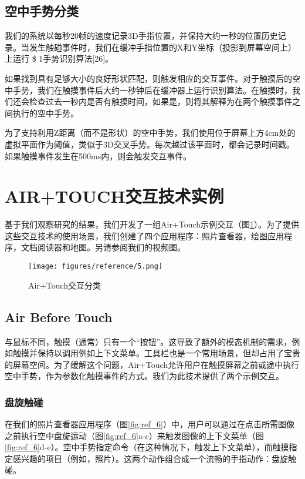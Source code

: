 \subsection{空中手势分类}

我们的系统以每秒20帧的速度记录3D手指位置，并保持大约一秒的位置历史记录。当发生触碰事件时，我们在缓冲手指位置的X和Y坐标（投影到屏幕空间上）上运行 \$ 1手势识别算法[26]。

如果找到具有足够大小的良好形状匹配，则触发相应的交互事件。对于触摸后的空中手势，我们在触摸事件后大约一秒钟后在缓冲器上运行识别算法。在触摸时，我们还会检查过去一秒内是否有触摸时间，如果是，则将其解释为在两个触摸事件之间执行的空中手势。

为了支持利用Z距离（而不是形状）的空中手势，我们使用位于屏幕上方4cm处的虚拟平面作为阈值，类似于3D交叉手势。每次越过该平面时，都会记录时间戳。如果触摸事件发生在500ms内，则会触发交互事件。

\section{AIR+TOUCH交互技术实例}

基于我们观察研究的结果，我们开发了一组Air+Touch示例交互（图\ref{fig:ref_5}）。为了提供这些交互技术的使用场景，我们创建了四个应用程序：照片查看器，绘图应用程序，文档阅读器和地图。另请参阅我们的视频图。

\begin{figure}
\centering
\texttt{[image: figures/reference/5.png]}
\caption{Air+Touch交互分类}
\label{fig:ref_5}
\end{figure}

\subsection{Air Before Touch}

与鼠标不同，触摸（通常）只有一个“按钮”。这导致了额外的模态机制的需求，例如触摸并保持以调用例如上下文菜单。工具栏也是一个常用场景，但却占用了宝贵的屏幕空间。为了缓解这个问题，Air+Touch允许用户在触摸屏幕之前或途中执行空中手势，作为参数化触摸事件的方式。我们为此技术提供了两个示例交互。

\subsubsection{盘旋触碰}

在我们的照片查看器应用程序（图\ref{fig:ref_6}）中，用户可以通过在点击所需图像之前执行空中盘旋运动（图\ref{fig:ref_6}a-c）来触发图像的上下文菜单（图\ref{fig:ref_6}d-e）。空中手势指定命令（在这种情况下，触发上下文菜单），而触摸指定感兴趣的项目（例如，照片）。这两个动作组合成一个流畅的手指动作：盘旋触碰。


